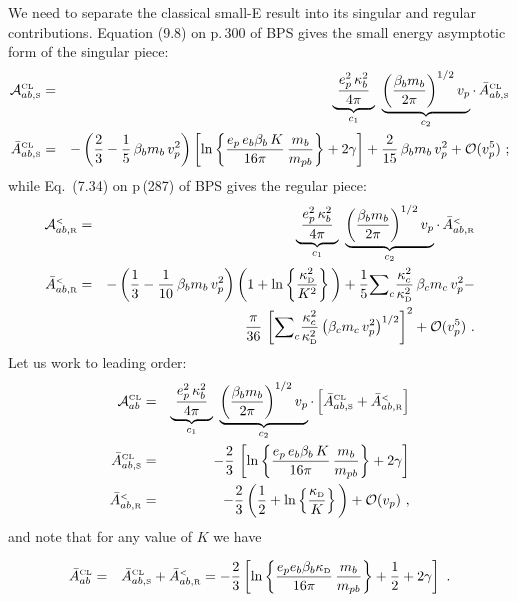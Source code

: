\documentclass[preprint,12pt,eqsecnum,nofootinbib,amsmath,amssymb]{revtex4}
\newcommand{\smR}{{\rm\scriptscriptstyle R}}
\newcommand{\smS}{{\rm\scriptscriptstyle S}}
\newcommand{\smD}{{\rm\scriptscriptstyle D}}
\newcommand{\smCL}{{\rm\scriptscriptstyle CL}}
\newcommand{\smLT}{{\rm\scriptscriptstyle <}}
\begin{document}
\pagebreak
We need to separate the classical small-E result into its singular and
regular contributions. Equation (9.8) on p.\,300 of BPS gives the
small energy asymptotic form of the singular piece: 
\begin{eqnarray}
  {\cal A}_{ab,\smS}^{\smCL}
  &=&
  \underbrace{~\frac{e_p^2\,\kappa_b^2}{4\pi}~}_{c_1}
  ~
  \underbrace{\left( \frac{\beta_b m_b}{2\pi}\right)^{1/2} v_p}_{
  c_2} 
  \cdot \,
  \bar A_{ab,\smS}^\smCL
\\
  \bar A_{ab,\smS}^\smCL
  &=&
  -\left(\frac{2}{3} - \frac{1}{5}\,\beta_b m_b\,v_p^2 \right)
  \left[\ln\left\{ \frac{e_p \,e_b \beta_b \, K}{16\pi}\,
  \frac{m_b}{m_{pb}}\right\} + 2 \gamma
  \right] 
  + 
  \frac{2}{15}\,\beta_b m_b \, v_p^2  
  +
  {\cal O}(v_p^5)\ ;
\end{eqnarray}
while Eq.~(7.34) on p\,(287) of BPS gives the regular
piece:
\begin{eqnarray}
  {\cal A}_{ab,\smR}^{\smLT} 
  &=&
  \underbrace{~\frac{e_p^2\,\kappa_b^2}{4\pi}~}_{c_1}
  ~
  \underbrace{\left( \frac{\beta_b m_b}{2\pi}\right)^{1/2} v_p}_{
  c_2} 
  \cdot \,
  \bar A_{ab,\smR}^\smLT
\\
\nonumber
  \bar A_{ab,\smR}^\smLT
  &=&
  -\left(\frac{1}{3} - \frac{1}{10}\,\beta_b m_b\, v_p^2 \right)
  \left(1 + \ln\left\{\frac{\kappa_\smD^2}{K^2} \right\}\, \right)
  +
  \frac{1}{5}{\sum}_c \frac{\kappa_c^2}{\kappa_\smD^2} \,
  \beta_c m_c\, v_p^2
  -
\\
  &&
  \frac{\pi}{36}\, \left[ {\sum}_c \frac{\kappa_c^2}{\kappa_\smD^2} 
  \left( \beta_c m_c\,v_p^2\right)^{1/2} \right]^2
  + 
  {\cal O}(v_p^5) \ .
\end{eqnarray}
Let us work to leading order:
\begin{eqnarray}
  {\cal A}_{ab}^{\smCL} 
  &=&
  \underbrace{~\frac{e_p^2\,\kappa_b^2}{4\pi}~}_{c_1}
  ~
  \underbrace{\left( \frac{\beta_b m_b}{2\pi}\right)^{1/2} v_p}_{
  c_2} 
  \cdot \,
  \Big[
  \bar A_{ab,\smS}^\smCL
  +
  \bar A_{ab,\smR}^\smLT
  \Big]
\\
  \bar A_{ab,\smS}^\smCL
  &=&
  -\frac{2}{3}\,
  \left[\ln\left\{ \frac{e_p \,e_b \beta_b \, K}{16\pi}\,
  \frac{m_b}{m_{pb}}\right\} + 2 \gamma
  \right] 
\\
  \bar A_{ab,\smR}^\smLT
  &=&
  -\frac{2}{3}
  \left(\frac{1}{2} + \ln\left\{\frac{\kappa_\smD}{K} \right\}\, \right)
  + 
  {\cal O}(v_p) \ ,
\end{eqnarray}
and note that for any value of $K$ we have

\begin{eqnarray}
  \bar A_{ab}^\smCL
  &=&
  \bar A_{ab, \smS}^\smCL + \bar A_{ab, \smR}^\smLT
  =
  -\frac{2}{3}\left[\ln\left\{ \frac{e_p e_b \beta_b \kappa_\smD}{16\pi}\,
  \frac{m_b}{m_{pb}}\right\} + \frac{1}{2} + 2 \gamma
  \right] \ .
\end{eqnarray}
\end{document}
